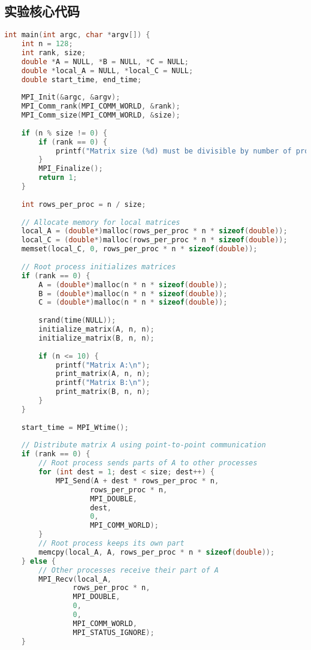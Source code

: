 \documentclass{SYSUReport}
\begin{document}
\subsection{实验核心代码}
% 
\begin{lstlisting}[language=C]
int main(int argc, char *argv[]) {
    int n = 128;
    int rank, size;
    double *A = NULL, *B = NULL, *C = NULL;
    double *local_A = NULL, *local_C = NULL;
    double start_time, end_time;
    
    MPI_Init(&argc, &argv);
    MPI_Comm_rank(MPI_COMM_WORLD, &rank);
    MPI_Comm_size(MPI_COMM_WORLD, &size);
    
    if (n % size != 0) {
        if (rank == 0) {
            printf("Matrix size (%d) must be divisible by number of processes (%d)\n", n, size);
        }
        MPI_Finalize();
        return 1;
    }
    
    int rows_per_proc = n / size;
    
    // Allocate memory for local matrices
    local_A = (double*)malloc(rows_per_proc * n * sizeof(double));
    local_C = (double*)malloc(rows_per_proc * n * sizeof(double));
    memset(local_C, 0, rows_per_proc * n * sizeof(double));
    
    // Root process initializes matrices
    if (rank == 0) {
        A = (double*)malloc(n * n * sizeof(double));
        B = (double*)malloc(n * n * sizeof(double));
        C = (double*)malloc(n * n * sizeof(double));
        
        srand(time(NULL));
        initialize_matrix(A, n, n);
        initialize_matrix(B, n, n);
        
        if (n <= 10) {
            printf("Matrix A:\n");
            print_matrix(A, n, n);
            printf("Matrix B:\n");
            print_matrix(B, n, n);
        }
    }
    
    start_time = MPI_Wtime();
    
    // Distribute matrix A using point-to-point communication
    if (rank == 0) {
        // Root process sends parts of A to other processes
        for (int dest = 1; dest < size; dest++) {
            MPI_Send(A + dest * rows_per_proc * n, 
                    rows_per_proc * n, 
                    MPI_DOUBLE, 
                    dest, 
                    0, 
                    MPI_COMM_WORLD);
        }
        // Root process keeps its own part
        memcpy(local_A, A, rows_per_proc * n * sizeof(double));
    } else {
        // Other processes receive their part of A
        MPI_Recv(local_A, 
                rows_per_proc * n, 
                MPI_DOUBLE, 
                0, 
                0, 
                MPI_COMM_WORLD, 
                MPI_STATUS_IGNORE);
    }
    

\end{lstlisting}
\end{document}
